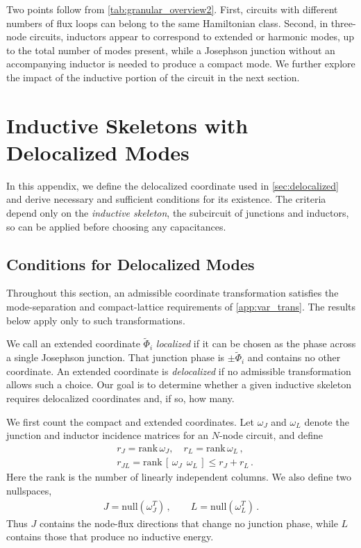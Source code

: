 Two points follow from \cref{tab:granular_overview2}. First, circuits with different numbers of flux loops can belong to the same Hamiltonian class. Second, in three-node circuits, inductors appear to correspond to extended or harmonic modes, up to the total number of modes present, while a Josephson junction without an accompanying inductor is needed to produce a compact mode. We further explore the impact of the inductive portion of the circuit in the next section.




\section{Inductive Skeletons with Delocalized Modes}\label{app:skeleton}


In this appendix, we define the delocalized coordinate used in \cref{sec:delocalized} and derive necessary and sufficient conditions for its existence.
The criteria depend only on the \emph{inductive skeleton}, the subcircuit of junctions and inductors, so can be applied before choosing any capacitances.


\subsection{Conditions for Delocalized Modes}

Throughout this section, an admissible coordinate transformation satisfies the mode-separation and compact-lattice requirements of \cref{app:var_trans}. The results below apply only to such transformations.


We call an extended coordinate $\tilde\Phi_i$ \emph{localized} if it can be chosen as the phase across a single Josephson junction. That junction phase is $\pm\tilde\Phi_i$ and contains no other coordinate. 
An extended coordinate is \emph{delocalized} if no admissible transformation allows such a choice. Our goal is to determine whether a given inductive skeleton requires delocalized coordinates and, if so, how many.


We first count the compact and extended coordinates. Let $\omega_J$ and $\omega_L$ denote the junction and inductor incidence matrices for an $N$-node circuit, and define
\begin{subequations}
\begin{align}
    &r_J = \textrm{rank}\,\omega_J, \quad r_L = \textrm{rank}\,\omega_L \, ,
    \label{eq:skel_ranks}\\
    &r_{JL} = \textrm{rank}\,[\,\omega_J\ \ \omega_L\,] \leq r_J + r_L\, .
\end{align}
\end{subequations}
Here the rank is the number of linearly independent columns. We also define two nullspaces,
\begin{align}
    J= \textrm{null}(\omega_J^T) \, , \qquad L= \textrm{null}(\omega_L^T) \, .
    \label{eq:skel_nullspaces}
\end{align}
 Thus $J$ contains the node-flux directions that change no junction phase, while $L$ contains those that produce no inductive energy.


